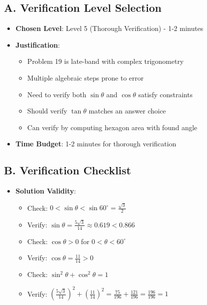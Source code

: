\documentclass[12pt]{article}
\begin{document}
\begin{verificationbox}
\subsection*{A. Verification Level Selection}
\begin{itemize}[leftmargin=*]
    \item \textbf{Chosen Level}: Level 5 (Thorough Verification) - 1-2 minutes
    
    \item \textbf{Justification}: 
    \begin{itemize}
        \item Problem 19 is late-band with complex trigonometry
        \item Multiple algebraic steps prone to error
        \item Need to verify both $\sin\theta$ and $\cos\theta$ satisfy constraints
        \item Should verify $\tan\theta$ matches an answer choice
        \item Can verify by computing hexagon area with found angle
    \end{itemize}
    
    \item \textbf{Time Budget}: 1-2 minutes for thorough verification
\end{itemize}

\subsection*{B. Verification Checklist}
\begin{itemize}[leftmargin=*]
    \item \textbf{Solution Validity}:
    \begin{itemize}
        \item Check: $0 < \sin\theta < \sin 60^{\circ} = \frac{\sqrt{3}}{2}$
        \item Verify: $\sin\theta = \frac{5\sqrt{3}}{14} \approx 0.619 < 0.866$ \checkmark
        \item Check: $\cos\theta > 0$ for $0 < \theta < 60^{\circ}$
        \item Verify: $\cos\theta = \frac{11}{14} > 0$ \checkmark
        \item Check: $\sin^2\theta + \cos^2\theta = 1$
        \item Verify: $\left(\frac{5\sqrt{3}}{14}\right)^2 + \left(\frac{11}{14}\right)^2 = \frac{75}{196} + \frac{121}{196} = \frac{196}{196} = 1$ \checkmark
    \end{itemize}
    

\end{itemize}
\end{verificationbox}
\end{document}
